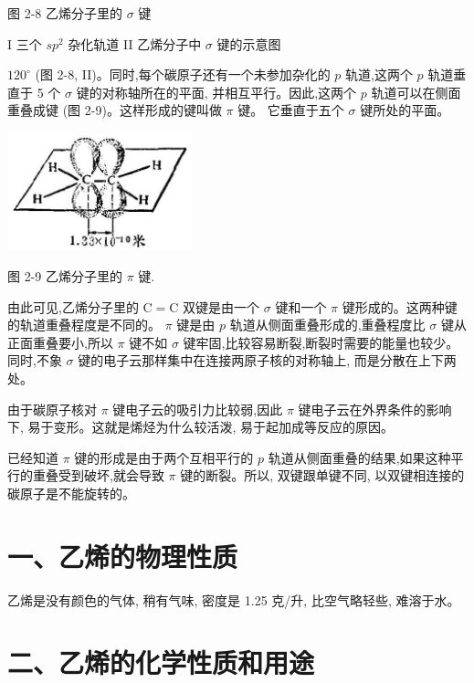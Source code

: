 \documentclass[10pt]{article}
\begin{document}
图 2-8 乙烯分子里的 \(\sigma\) 键

I 三个 \(s{p}^{2}\) 杂化轨道 II 乙烯分子中 \(\sigma\) 键的示意图

\({120}^{ \circ }\) (图 2-8, II)。同时,每个碳原子还有一个未参加杂化的 \(p\) 轨道,这两个 \(p\) 轨道垂直于 5 个 \(\sigma\) 键的对称轴所在的平面, 并相互平行。因此,这两个 \(p\) 轨道可以在侧面重叠成键 (图 2-9)。这样形成的键叫做 \(\pi\) 键。 它垂直于五个 \(\sigma\) 键所处的平面。

\begin{center}
\includegraphics[max width=0.4\textwidth]{images/01912d16-be99-77bb-9535-4f3ed8d9946f_69_804470.jpg}
\end{center}

图 2-9 乙烯分子里的 \(\pi\) 键.

由此可见,乙烯分子里的 \(\mathrm{C} = \mathrm{C}\) 双键是由一个 \(\sigma\) 键和一个 \(\pi\) 键形成的。这两种键的轨道重叠程度是不同的。 \(\pi\) 键是由 \(p\) 轨道从侧面重叠形成的,重叠程度比 \(\sigma\) 键从正面重叠要小,所以 \(\pi\) 键不如 \(\sigma\) 键牢固,比较容易断裂,断裂时需要的能量也较少。同时,不象 \(\sigma\) 键的电子云那样集中在连接两原子核的对称轴上, 而是分散在上下两处。

由于碳原子核对 \(\pi\) 键电子云的吸引力比较弱,因此 \(\pi\) 键电子云在外界条件的影响下, 易于变形。这就是烯烃为什么较活泼, 易于起加成等反应的原因。

已经知道 \(\pi\) 键的形成是由于两个互相平行的 \(p\) 轨道从侧面重叠的结果,如果这种平行的重叠受到破坏,就会导致 \(\pi\) 键的断裂。所以, 双键跟单键不同, 以双键相连接的碳原子是不能旋转的。

\section*{一、乙烯的物理性质}

乙烯是没有颜色的气体, 稍有气味, 密度是 1.25 克/升, 比空气略轻些, 难溶于水。

\section*{二、乙烯的化学性质和用途}
\end{document}

